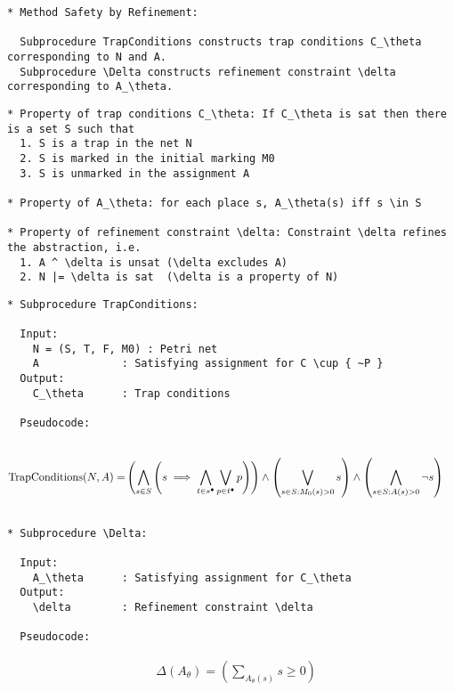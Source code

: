 \iffalse
\begin{verbatim}
* Method Safety by Refinement:

  Subprocedure TrapConditions constructs trap conditions C_\theta corresponding to N and A.
  Subprocedure \Delta constructs refinement constraint \delta corresponding to A_\theta.
\end{verbatim}





\begin{verbatim}
* Property of trap conditions C_\theta: If C_\theta is sat then there is a set S such that
  1. S is a trap in the net N
  2. S is marked in the initial marking M0
  3. S is unmarked in the assignment A

* Property of A_\theta: for each place s, A_\theta(s) iff s \in S

* Property of refinement constraint \delta: Constraint \delta refines the abstraction, i.e.
  1. A ^ \delta is unsat (\delta excludes A)
  2. N |= \delta is sat  (\delta is a property of N)
\end{verbatim}

\newpage

\begin{verbatim}
* Subprocedure TrapConditions:

  Input:
    N = (S, T, F, M0) : Petri net
    A             : Satisfying assignment for C \cup { ~P }
  Output:
    C_\theta      : Trap conditions

  Pseudocode:
  
\end{verbatim}
\begin{align*}
  \text{TrapConditions}(N, A) =& \left(
      \bigwedge_{s \in S} \left( s \implies
      \bigwedge_{t \in s^{\bullet}} \bigvee_{p \in t^{\bullet}} p
    \right) \right) \land
    \left( \bigvee_{s \in S: M_0(s) > 0} s \right) \land
    \left( \bigwedge_{s \in S: A(s) > 0} \neg s \right)
\end{align*}
\begin{verbatim}

* Subprocedure \Delta:

  Input:
    A_\theta      : Satisfying assignment for C_\theta
  Output:
    \delta        : Refinement constraint \delta

  Pseudocode:

\end{verbatim}
\begin{align*}
  & \Delta(A_\theta) = \left( \sum_{A_\theta(s)} s \ge 0 \right)
\end{align*}

